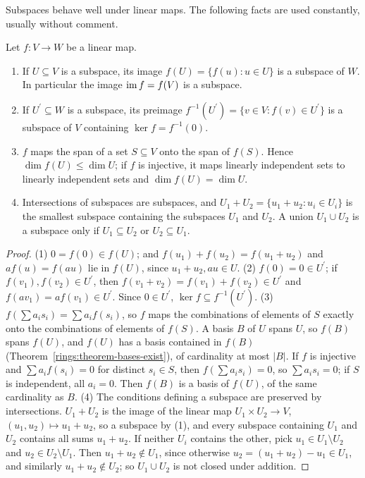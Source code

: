 Subspaces behave well under linear maps. The following facts are used constantly, usually without comment.

\begin{lemma}\label{linear-algebra:lemma-images-subspaces}
Let $f \colon V \to W$ be a linear map.
\begin{enumerate}
\item If $U \subseteq V$ is a subspace, its image $f(U) = \{f(u) : u \in U\}$ is a subspace of $W$. In particular the image $\operatorname{im} f = f(V)$ is a subspace.
\item If $U^{\prime} \subseteq W$ is a subspace, its preimage $f^{-1}(U^{\prime}) = \{v \in V : f(v) \in U^{\prime}\}$ is a subspace of $V$ containing $\ker f = f^{-1}(0)$.
\item $f$ maps the span of a set $S \subseteq V$ onto the span of $f(S)$. Hence $\dim f(U) \leq \dim U$; if $f$ is injective, it maps linearly independent sets to linearly independent sets and $\dim f(U) = \dim U$.
\item Intersections of subspaces are subspaces, and $U_1 + U_2 = \{u_1 + u_2 : u_i \in U_i\}$ is the smallest subspace containing the subspaces $U_1$ and $U_2$. A union $U_1 \cup U_2$ is a subspace only if
$U_1 \subseteq U_2$ or $U_2 \subseteq U_1$.
\end{enumerate}
\end{lemma}

\begin{proof}
(1) $0 = f(0) \in f(U)$; and $f(u_1) + f(u_2) = f(u_1 + u_2)$ and $af(u) = f(au)$ lie in $f(U)$, since $u_1 + u_2, au \in U$. (2) $f(0) = 0 \in U^{\prime}$; if $f(v_1), f(v_2) \in U^{\prime}$, then
$f(v_1 + v_2) = f(v_1) + f(v_2) \in U^{\prime}$ and $f(av_1) = af(v_1) \in U^{\prime}$. Since $0 \in U^{\prime}$, $\ker f \subseteq f^{-1}(U^{\prime})$.
(3) $f(\sum a_is_i) = \sum a_if(s_i)$, so $f$ maps the combinations of elements of $S$ exactly onto the combinations of elements of $f(S)$. A basis $B$ of $U$ spans $U$, so $f(B)$ spans $f(U)$, and $f(U)$
has a basis contained in $f(B)$ (Theorem~\ref{rings:theorem-bases-exist}), of cardinality at most $|B|$. If $f$ is injective and $\sum a_if(s_i) = 0$ for distinct $s_i \in S$, then $f(\sum a_is_i) = 0$, so
$\sum a_is_i = 0$; if $S$ is independent, all $a_i = 0$. Then $f(B)$ is a basis of $f(U)$, of the same cardinality as $B$.
(4) The conditions defining a subspace are preserved by intersections. $U_1 + U_2$ is the image of the linear map $U_1 \times U_2 \to V$, $(u_1, u_2) \mapsto u_1 + u_2$, so a subspace by (1), and every subspace
containing $U_1$ and $U_2$ contains all sums $u_1 + u_2$. If neither $U_i$ contains the other, pick $u_1 \in U_1 \setminus U_2$ and $u_2 \in U_2 \setminus U_1$. Then $u_1 + u_2 \notin U_1$, since otherwise
$u_2 = (u_1 + u_2) - u_1 \in U_1$, and similarly $u_1 + u_2 \notin U_2$; so $U_1 \cup U_2$ is not closed under addition.
\end{proof}

